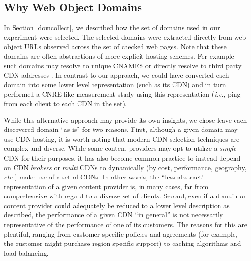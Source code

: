 \subsection{Why Web Object Domains}

In Section \ref{domcollect}, we described how the set of domains used in our
experiment were selected. The selected domains were extracted directly
from web object URLs observed across the set of checked web pages. Note
that these domains are often abstractions of more explicit hosting schemes.
For example, such domains may resolve to unique CNAMES or directly resolve
to third party CDN addresses \cite{Su2006}. In contrast to our approach, we could have
converted each domain into some lower level representation (such as its CDN) and
in turn performed a CNRE-like measurement study using this representation
(\emph{i.e.}, ping from each client to each CDN in the set).

While this alternative approach may provide its own insights, we chose leave
each discovered domain ``as is'' for two reasons. First, although a given domain
may use CDN hosting, it is worth noting that modern CDN selection techniques are
complex and diverse. While some content providers may opt to utilize a
\emph{single} CDN for their purposes, it has also become common practice to
instead depend on CDN \emph{brokers} or \emph{multi} CDNs to dynamically (by
cost, performance, geography, \emph{etc.}) make use of a set of CDNs. In other
words, the ``less abstract'' representation of a given content provider is, in
many cases, far from comprehensive with regard to a diverse set of clients.
Second, even if a domain or content provider could adequately be reduced to a
lower level description as described, the performance of a given CDN ``in
general'' is not necessarily representative of the performance of one of its
customers. The reasons for this are plentiful, ranging from customer specific
policies and agreements (for example, the customer might purchase region
specific support) to caching algorithms and load balancing. 
